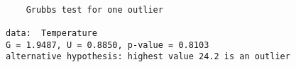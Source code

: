\begin{verbatim} 

	Grubbs test for one outlier

data:  Temperature
G = 1.9487, U = 0.8850, p-value = 0.8103
alternative hypothesis: highest value 24.2 is an outlier

\end{verbatim}